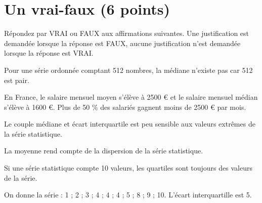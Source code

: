 \section{Un vrai-faux (6 points)}

Répondez par VRAI ou FAUX aux affirmations suivantes. Une justification est demandée lorsque la réponse est FAUX, aucune justification n'est demandée lorsque la réponse est VRAI.

\begin{questions}
	\question[1] Pour une série ordonnée comptant 512 nombres, la médiane n'existe pas car 512 est pair.
	
	\question[1] En France, le salaire mensuel moyen s'élève à \num{2500} € et le salaire mensuel médian s'élève à \num{1600} €. Plus de 50 \% des salariés gagnent moins de \num{2500} € par mois.
	
	\question[1] Le couple médiane et écart interquartile est peu sensible aux valeurs extrêmes de la série statistique.
	
	\question[1] La moyenne rend compte de la dispersion de la série statistique.
	
	\question[1] Si une série statistique compte 10 valeurs, les quartiles sont toujours des valeurs de la série.
	
	\question[1] On donne la série : 1 ; 2 ; 3 ; 4 ; 4 ; 4 ; 5 ; 8 ; 9 ; 10. L'écart interquartille est 5.
\end{questions}